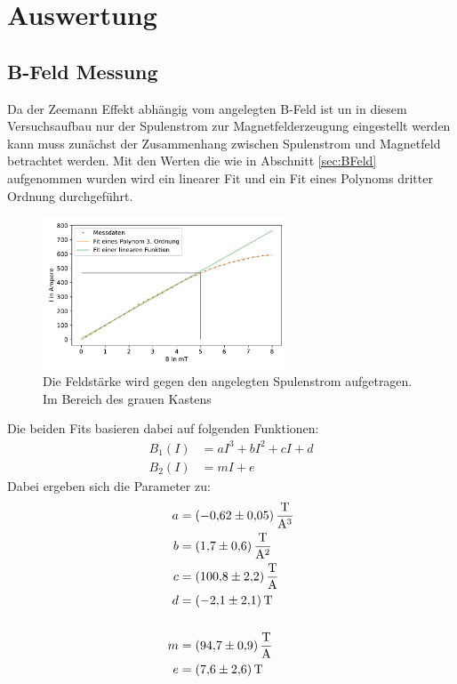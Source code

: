 \newpage
\section{Auswertung}
\label{sec:auswertung}
\subsection{B-Feld Messung}
Da der Zeemann Effekt abhängig vom angelegten B-Feld ist un in diesem Versuchsaufbau nur der Spulenstrom zur Magnetfelderzeugung eingestellt werden kann muss zunächst der Zusammenhang zwischen Spulenstrom und Magnetfeld betrachtet werden.
Mit den Werten die wie in Abschnitt \ref{sec:BFeld} aufgenommen wurden wird ein linearer Fit und ein Fit eines Polynoms dritter Ordnung durchgeführt.\\
\begin{figure}[ht]
    \center
    \includegraphics[width=0.65\textwidth]{plots/B_Feld.pdf}
    \caption{Die Feldstärke wird gegen den angelegten Spulenstrom aufgetragen. Im Bereich des grauen Kastens }
    \label{fig:B_Feld}
\end{figure}
Die beiden Fits basieren dabei auf folgenden Funktionen:
\begin{align*}
    B_1(I) &= aI^3+bI^2+cI+d\\
    B_2(I) &= mI+e
\end{align*}
Dabei ergeben sich die Parameter zu:
\begin{align*}
    a &= \SI[per-mode = fraction]{-0.62 +- 0.05}{\tesla \per \cubic \ampere}\\
    b &= \SI[per-mode = fraction]{1.7+-0.6}{\tesla \per \square \ampere}\\
    c &= \SI[per-mode = fraction]{100.8+-2.2}{\tesla \per \ampere}\\
    d &= \SI[per-mode = fraction]{-2.1+-2.1}{\tesla}\\
    \\
    m &= \SI[per-mode = fraction]{94.7+-0.9}{\tesla \per \ampere}\\
    e &= \SI[per-mode = fraction]{7.6+-2.6}{\tesla}\\ 
\end{align*}
